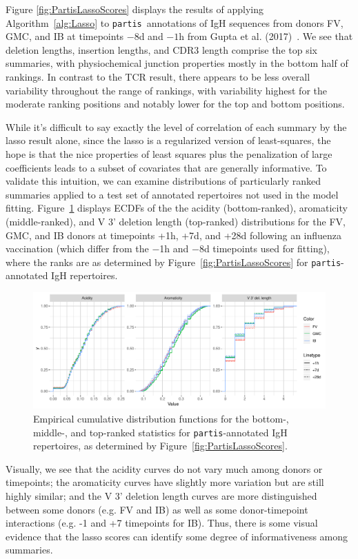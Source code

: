 \documentclass{article}
\newcommand{\partis}{\texttt{partis}}
\begin{document}
Figure \ref{fig:PartisLassoScores} displays the results of applying Algorithm~\ref{alg:Lasso} to \partis\ annotations of IgH sequences from donors FV, GMC, and IB at timepoints $-8$d and $-1$h from Gupta et al. (2017)~\cite{Gupta2017-ve}.
We see that deletion lengths, insertion lengths, and CDR3 length comprise the top six summaries, with physiochemical junction properties mostly in the bottom half of rankings.
In contrast to the TCR result, there appears to be less overall variability throughout the range of rankings, with variability highest for the moderate ranking positions and notably lower for the top and bottom positions.

While it's difficult to say exactly the level of correlation of each summary by the lasso result alone, since the lasso is a regularized version of least-squares, the hope is that the nice properties of least squares plus the penalization of large coefficients leads to a subset of covariates that are generally informative.
To validate this intuition, we can examine distributions of particularly ranked summaries applied to a test set of annotated repertoires not used in the model fitting.
Figure~\ref{fig:LassoValidation} displays ECDFs of the the acidity (bottom-ranked), aromaticity (middle-ranked), and V 3' deletion length (top-ranked) distributions for the FV, GMC, and IB donors at timepoints +1h, +7d, and +28d following an influenza vaccination (which differ from the $-$1h and $-$8d timepoints used for fitting), where the ranks are as determined by Figure~\ref{fig:PartisLassoScores} for \partis-annotated IgH repertoires.
\begin{figure}
	\includegraphics[width=\linewidth]{Figures/Lasso/validation_ecdfs.pdf}
	\caption{Empirical cumulative distribution functions for the bottom-, middle-, and top-ranked statistics for \partis-annotated IgH repertoires, as determined by Figure~\ref{fig:PartisLassoScores}.}
	\label{fig:LassoValidation}
\end{figure}
Visually, we see that the acidity curves do not vary much among donors or timepoints; the aromaticity curves have slightly more variation but are still highly similar; and the V 3' deletion length curves are more distinguished between some donors (e.g. FV and IB) as well as some donor-timepoint interactions (e.g. -1 and +7 timepoints for IB).
Thus, there is some visual evidence that the lasso scores can identify some degree of informativeness among summaries.
\end{document}
